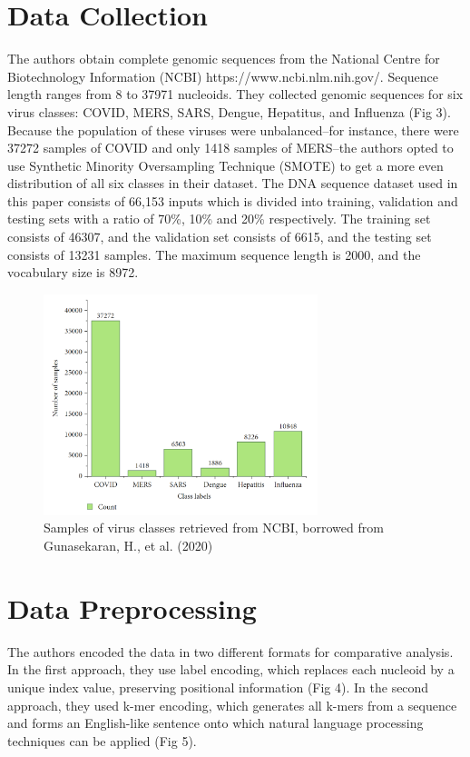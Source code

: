 \documentclass[journal]{IEEEtran}
\begin{document}
\section{Data Collection}
  The authors obtain complete genomic sequences from the
  National Centre for Biotechnology Information (NCBI) https://www.ncbi.nlm.nih.gov/.
  Sequence length ranges from 8 to 37971 nucleoids. They collected genomic sequences
  for six virus classes: COVID, MERS, SARS, Dengue, Hepatitus, and Influenza (Fig 3).
  Because the population of these viruses were unbalanced--for instance, there were 37272
  samples of COVID and only 1418 samples of MERS--the authors opted to use
  Synthetic Minority Oversampling Technique (SMOTE) to get a more even distribution of
  all six classes in their dataset.
  The DNA sequence dataset used in this paper consists of 66,153 inputs which is divided into training,
  validation and testing sets with a ratio of 70\%, 10\% and 20\% respectively.
  The training set consists of 46307, and the validation set consists of 6615, and the testing set consists of 13231 samples.
  The maximum sequence length is 2000, and the vocabulary size is 8972.

  \begin{figure}
    \centering
    \includegraphics[width=8cm]{figures/data_collection.png}
    \caption{Samples of virus classes retrieved from NCBI, borrowed from Gunasekaran, H., et al. (2020)}
  \end{figure}

\section{Data Preprocessing}
  The authors encoded the data in two different formats for comparative analysis.
  In the first approach, they use label encoding, which replaces each nucleoid by a unique index value,
  preserving positional information (Fig 4).
  In the second approach, they used k-mer encoding, which generates all k-mers from a sequence
  and forms an English-like sentence onto which natural language processing techniques
  can be applied (Fig 5).
\end{document}
